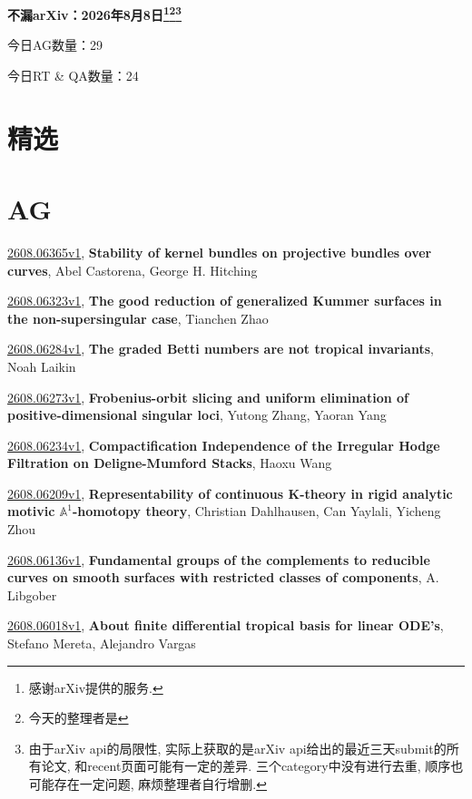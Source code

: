 \documentclass[9pt, a4paper]{article}
\theoremstyle{plain}
\theoremstyle{definition}
\theoremstyle{remark}
\newcommand{\arxiv}[3]{\href{https://arxiv.org/abs/#1}{#1}, \textbf{\textcolor{arxivblue}{#2}}, #3}
\newcommand{\AGnumber}{29}
\newcommand{\RTQAnumber}{24}
\newcommand{\NewestDate}{2026年8月8日}
\newcommand{\todayarXiver}{} %
\begin{document}
\begin{center}
    \Huge\textbf{不漏arXiv：\NewestDate\footnote{感谢arXiv提供的服务.}\footnote{今天的整理者是\todayarXiver}\footnote{由于arXiv api的局限性, 实际上获取的是arXiv api给出的最近三天submit的所有论文, 和recent页面可能有一定的差异. 三个category中没有进行去重, 顺序也可能存在一定问题, 麻烦整理者自行增删.}} \\
\end{center}

\setcounter{section}{-1}

\begin{center}
    今日AG数量：\AGnumber
    
    今日RT \& QA数量：\RTQAnumber
    
\end{center}


\section{精选}


\section{AG}
\arxiv{2608.06365v1}{Stability of kernel bundles on projective bundles over curves}{Abel Castorena, George H. Hitching}

\arxiv{2608.06323v1}{The good reduction of generalized Kummer surfaces in the non-supersingular case}{Tianchen Zhao}

\arxiv{2608.06284v1}{The graded Betti numbers are not tropical invariants}{Noah Laikin}

\arxiv{2608.06273v1}{Frobenius-orbit slicing and uniform elimination of positive-dimensional singular loci}{Yutong Zhang, Yaoran Yang}

\arxiv{2608.06234v1}{Compactification Independence of the Irregular Hodge Filtration on Deligne-Mumford Stacks}{Haoxu Wang}

\arxiv{2608.06209v1}{Representability of continuous K-theory in rigid analytic motivic $\mathbb{A}^1$-homotopy theory}{Christian Dahlhausen, Can Yaylali, Yicheng Zhou}

\arxiv{2608.06136v1}{Fundamental groups of the complements to reducible curves on smooth surfaces with restricted classes of components}{A. Libgober}

\arxiv{2608.06018v1}{About finite differential tropical basis for linear ODE's}{Stefano Mereta, Alejandro Vargas}
\end{document}

